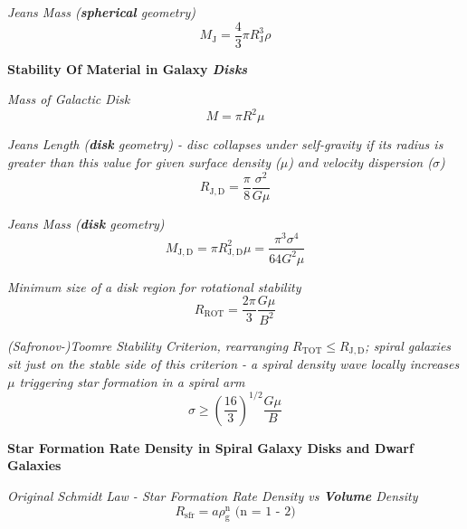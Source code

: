 \documentclass{article}
\begin{document}
\textit{Jeans Mass (\textbf{spherical} geometry)}
\begin{equation}
M_\mathrm{J} = \frac{4}{3} \pi R^3_\mathrm{J} \rho
\end{equation}


\textbf {Stability Of Material in Galaxy \textit{Disks}}

\textit {Mass of Galactic Disk}
\begin{equation}
M = \pi R^2 \mu 
\end{equation}
\begin{center}
\end{center}

\textit {Jeans Length (\textbf{disk} geometry) - disc collapses under self-gravity if its radius is greater than this value for given surface density (\(\mu\)) and velocity dispersion (\(\sigma\)) }
\begin{equation}
R_\mathrm{J, D} = \frac {\pi}{8} \frac {\sigma^2}{G \mu}
\end{equation}

\textit {Jeans Mass (\textbf{disk} geometry)}
\begin{equation}
M_\mathrm{J, D} = \pi R^2_\mathrm{J,D} \mu = \frac{\pi^3 \sigma^4}{64 G^2 \mu}
\end{equation}

\textit {Minimum size of a disk region for rotational stability}
\begin{equation}
R_\mathrm{ROT} = \frac {2\pi}{3} \frac {G \mu}{B^2}
\end{equation}
\begin{center}
\end{center}

\textit {(Safronov-)Toomre Stability Criterion, rearranging \(R_\mathrm{TOT} \leq R_\mathrm{J, D}\); spiral galaxies sit just on the stable side of this criterion - a spiral density wave locally increases \(\mu\) triggering star formation in a spiral arm}
\begin{equation}
\sigma \geq \left( \frac {16}{3} \right) ^{1/2} \frac {G \mu}{B}
\end{equation}

\textbf {Star Formation Rate Density in Spiral Galaxy Disks and Dwarf Galaxies}

\textit {Original Schmidt Law - Star Formation Rate Density vs \textbf{Volume} Density}
\begin{equation}
R_\mathrm{sfr} = a \rho^\mathrm{n}_\mathrm{g} \text{ (n = 1 - 2)}
\end{equation}
\end{document}
